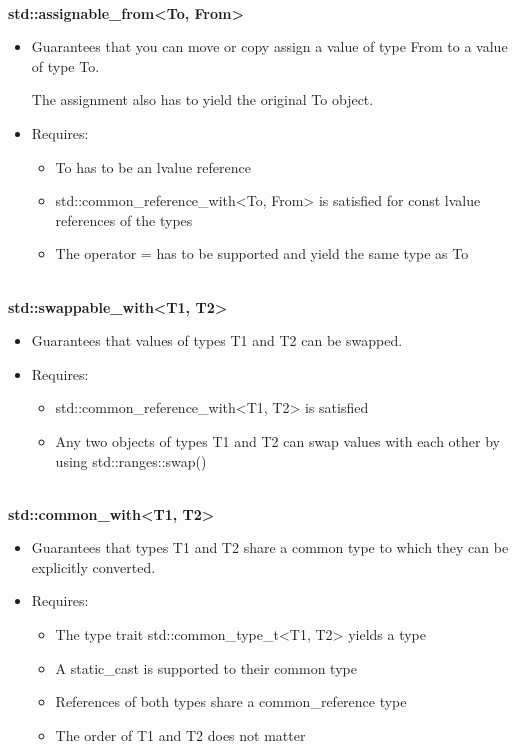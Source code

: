 \noindent
\hspace*{\fill} \\ %
\textbf{std::assignable\_from<To, From>}

\begin{itemize}
\item
Guarantees that you can move or copy assign a value of type From to a value of type To.

The assignment also has to yield the original To object.

\item
Requires:
\begin{itemize}
\item
To has to be an lvalue reference

\item
std::common\_reference\_with<To, From> is satisfied for const lvalue references of the types

\item
The operator = has to be supported and yield the same type as To
\end{itemize}
\end{itemize}

\noindent
\hspace*{\fill} \\ %
\textbf{std::swappable\_with<T1, T2>}

\begin{itemize}
\item
Guarantees that values of types T1 and T2 can be swapped.

\item
Requires:
\begin{itemize}
\item
std::common\_reference\_with<T1, T2> is satisfied

\item
Any two objects of types T1 and T2 can swap values with each other by using std::ranges::swap()
\end{itemize}
\end{itemize}

\noindent
\hspace*{\fill} \\ %
\textbf{std::common\_with<T1, T2>}

\begin{itemize}
\item
Guarantees that types T1 and T2 share a common type to which they can be explicitly converted.

\item
Requires:
\begin{itemize}
\item
The type trait std::common\_type\_t<T1, T2> yields a type

\item
A static\_cast is supported to their common type

\item
References of both types share a common\_reference type

\item
The order of T1 and T2 does not matter
\end{itemize}
\end{itemize}

